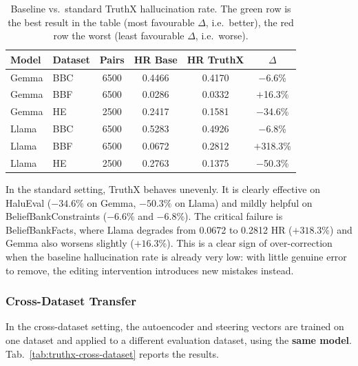 \begin{table}[H]
\centering
\setlength{\tabcolsep}{4pt}
\begin{tabular}{llcccc}
\toprule
\textbf{Model} & \textbf{Dataset} & \textbf{Pairs} & \textbf{HR Base} & \textbf{HR TruthX} & \textbf{$\Delta$} \\
\midrule
Gemma & BBC & 6500 & 0.4466 & 0.4170 & $-$6.6\% \\
Gemma & BBF & 6500 & 0.0286 & 0.0332 & $+$16.3\% \\
Gemma & HE  & 2500 & 0.2417 & 0.1581 & $-$34.6\% \\
\midrule
Llama & BBC & 6500 & 0.5283 & 0.4926 & $-$6.8\% \\
\rowcolor{red!25}Llama & BBF & 6500 & 0.0672 & 0.2812 & $+$318.3\% \\
\rowcolor{green!25}Llama & HE  & 2500 & 0.2763 & 0.1375 & $-$50.3\% \\
\bottomrule
\end{tabular}
\caption{Baseline vs.\ standard TruthX hallucination rate. The green row is the best result in the table (most favourable $\Delta$, i.e.\ better), the red row the worst (least favourable $\Delta$, i.e.\ worse).}
\label{tab:truthx-baseline-standard}
\end{table}

In the standard setting, TruthX behaves unevenly. It is clearly effective on HaluEval ($-34.6\%$ on Gemma, $-50.3\%$ on Llama) and mildly helpful on BeliefBankConstraints ($-6.6\%$ and $-6.8\%$). The critical failure is BeliefBankFacts, where Llama degrades from 0.0672 to 0.2812 HR ($+318.3\%$) and Gemma also worsens slightly ($+16.3\%$). This is a clear sign of over-correction when the baseline hallucination rate is already very low: with little genuine error to remove, the editing intervention introduces new mistakes instead.

\subsubsection{Cross-Dataset Transfer}

In the cross-dataset setting, the autoencoder and steering vectors are trained on one dataset and applied to a different evaluation dataset, using the \textbf{same model}. Tab.~\ref{tab:truthx-cross-dataset} reports the results.

